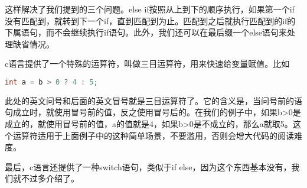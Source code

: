 这样解决了我们提到的三个问题。else if按照从上到下的顺序执行，如果第一个if没有匹配到，就转到下一个if，直到匹配到为止。匹配到之后就执行匹配到的if的下属语句，而不会继续执行if语句。此外，我们还可以在最后缀一个else语句来处理缺省情况。

c语言提供了一个特殊的运算符，叫做三目运算符，用来快速给变量赋值。比如

\begin{lstlisting}[language=C]
    int a = b > 0 ? 4 : 5;
\end{lstlisting}

此处的英文问号和后面的英文冒号就是三目运算符了。它的含义是，当问号前的语句成立时，就使用冒号前的值，反之使用冒号后的。在我们的例子中，如果b>0是成立的，就使用冒号前的值，a的值就是4，如果b>0是不成立的，那么a就取5。这个运算符适用于上面例子中的这种简单场景，不要滥用，否则会增大代码的阅读难度。

最后，c语言还提供了一种switch语句，类似于if else，因为这个东西基本没有，我们就不过多介绍了。
